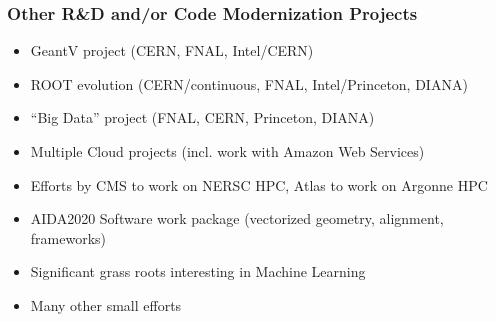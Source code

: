 \begin{frame}
\frametitle{Other R\&D and/or Code Modernization Projects}

\begin{itemize}
\item GeantV project (CERN, FNAL, Intel/CERN)
\item ROOT evolution (CERN/continuous, FNAL, Intel/Princeton, DIANA)
\item ``Big Data'' project (FNAL, CERN, Princeton, DIANA)
\item Multiple Cloud projects (incl. work with Amazon Web Services)
\item Efforts by CMS to work on NERSC HPC, Atlas to work on Argonne HPC
\item AIDA2020 Software work package (vectorized geometry, alignment, frameworks)
\item Significant grass roots interesting in Machine Learning 
\item Many other small efforts
\end{itemize}

\end{frame}


